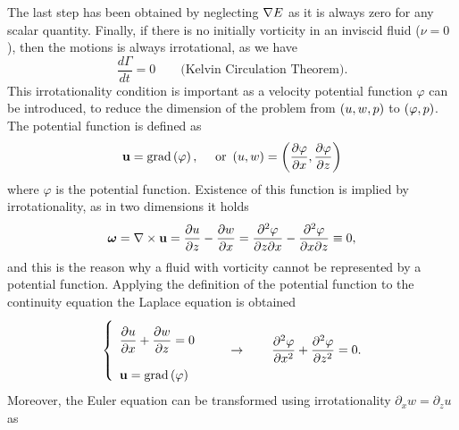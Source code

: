 The last step has been obtained by neglecting $\nabla\time\nabla E$ as it is always zero for any scalar quantity. Finally, if there is no initially vorticity in an inviscid fluid ($\nu=0$), then the motions is always irrotational, as we have
\begin{equation}
\dfrac{d\Gamma}{dt}=0 \qquad \text{(Kelvin Circulation Theorem)}.
\end{equation}
This irrotationality condition is important as a velocity potential function $\varphi$ can be introduced, to reduce the dimension of the problem from $\left( u,w,p \right)$ to $\left( \varphi,p \right)$. The potential function is defined as
\begin{equation}
\mathbf{u}=\text{grad}\left( \varphi \right), \quad \text{ or } \left( u,w \right)=\left( \dfrac{\partial\varphi}{\partial x},\dfrac{\partial\varphi}{\partial z} \right)
\end{equation}
where $\varphi$ is the potential function. Existence of this function is implied by irrotationality, as in two dimensions it holds
\begin{equation*}
\boldsymbol{\omega}=\nabla\times\mathbf{u}=\dfrac{\partial u}{\partial z}-\dfrac{\partial w}{\partial x}=\dfrac{\partial^{2}\varphi}{\partial z\partial x}-\dfrac{\partial^{2}\varphi}{\partial x\partial z}\equiv 0,
\end{equation*}
and this is the reason why a fluid with vorticity cannot be represented by a potential function. Applying the definition of the potential function to the continuity equation the Laplace equation is obtained
\begin{equation}
\left\lbrace\begin{array}{l}
\vphantom{\int^{\dfrac{1}{2}}}\dfrac{\partial u}{\partial x}+\dfrac{\partial w}{\partial z}=0 \\
\mathbf{u}=\text{grad}\rbkt{\varphi}
\vphantom{\int^{\dfrac{1}{2}}}\end{array}\right. \qquad\rightarrow\qquad \dfrac{\partial^{2} \varphi}{\partial x^{2}}+\dfrac{\partial^{2}\varphi}{\partial z^{2}}=0.
\end{equation}
Moreover, the Euler equation can be transformed using irrotationality $\partial_{x}w=\partial_{z}u$ as 
